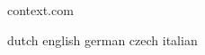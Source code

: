 


\startlogginginterface context.com



\startcommands                    dutch                            english
                                  german                           czech
                                  italian

